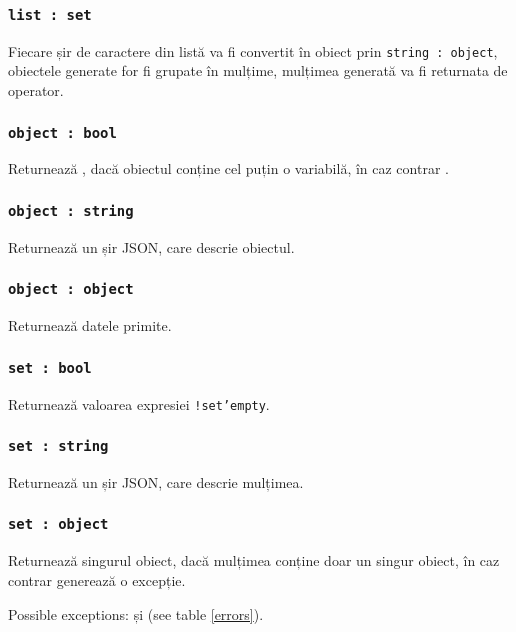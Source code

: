 \subsubsection{\texttt{list : set}}

Fiecare șir de caractere din listă va fi convertit în obiect prin \texttt{string : object}, obiectele generate for fi grupate în mulțime, mulțimea generată va fi returnata de operator.

\subsubsection{\texttt{object : bool}}

Returnează \true, dacă obiectul conține cel puțin o variabilă, în caz contrar \false.

\subsubsection{\texttt{object : string}}

Returnează un șir JSON, care descrie obiectul.

\subsubsection{\texttt{object : object}}

Returnează datele primite.

\subsubsection{\texttt{set : bool}}

Returnează valoarea expresiei \texttt{!set'empty}.

\subsubsection{\texttt{set : string}}

Returnează un șir JSON, care descrie mulțimea.

\subsubsection{\texttt{set : object}}

Returnează singurul obiect, dacă mulțimea conține doar un singur obiect, în caz contrar generează o excepție.

Possible exceptions:  și  (see table \ref{errors}).

